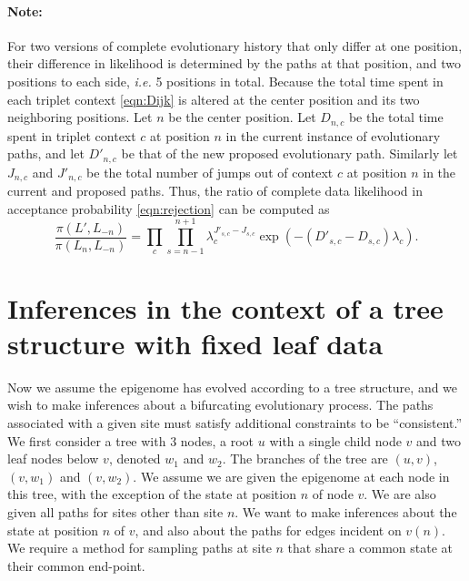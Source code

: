 \documentclass[11pt]{article}
\begin{document}
\paragraph{Note:} For two versions of complete evolutionary history
that only differ at one position, their difference in likelihood is
determined by the paths at that position, and two positions to each
side, \textit{i.e.} 5 positions in total. Because the total time spent
in each triplet context \eqref{eqn:Dijk} is altered at the center
position and its two neighboring positions. Let $n$  be the center position.
Let $D_{n,c}$ be the total time spent in triplet context $c$ at position $n$
in the current instance of evolutionary paths, and let $D'_{n,c}$ be that of
the new proposed evolutionary path. Similarly let $J_{n,c}$ and $J'_{n,c}$ be
the total number of jumps out of context $c$ at position $n$ in the
current and proposed paths. Thus, the ratio of complete data
likelihood in acceptance probability \eqref{eqn:rejection} can be
computed as
\[
\frac{\pi(L', L_{-n})}{\pi(L_n, L_{-n})} = \prod\limits_{c}\prod\limits_{s=n-1}^{n+1}
\lambda_c^{J'_{s,c} - J_{s,c}} \exp(-(D'_{s,c}-D_{s,c})\lambda_c).
\]



\section{Inferences in the context of a tree structure with fixed leaf data}

Now we assume the epigenome has evolved according to a tree structure,
and we wish to make inferences about a bifurcating evolutionary
process. The paths associated with a given site must satisfy
additional constraints to be ``consistent.'' We first consider a tree
with 3 nodes, a root $u$ with a single child node $v$ and two leaf
nodes below $v$, denoted $w_1$ and $w_2$. The branches of the tree are
$(u, v)$, $(v, w_1)$ and $(v, w_2)$. We assume we are given the
epigenome at each node in this tree, with the exception of the state
at position $n$ of node $v$. We are also given all paths for sites
other than site $n$. We want to make inferences about the state at
position $n$ of $v$, and also about the paths for edges incident on
$v(n)$. We require a method for sampling paths at site $n$ that share
a common state at their common end-point.
\end{document}
